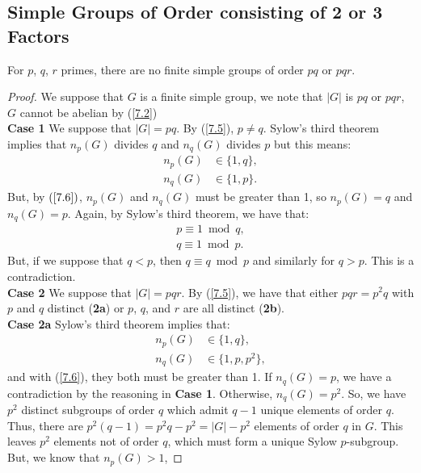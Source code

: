 \subsection{Simple Groups of Order consisting of 2 or 3 Factors} \label{7.8}

For $p$, $q$, $r$ primes, there are no finite simple groups
of order $pq$ or $pqr$.

\begin{proof}
    We suppose that $G$ is a finite simple group, we note that
    $|G|$ is $pq$ or $pqr$, $G$ cannot be abelian by (\ref{7.2})
    \\[\baselineskip]
    \textbf{Case 1} We suppose that $|G| = pq$. By (\ref{7.5}),
    $p \neq q$. Sylow's third theorem implies that $n_p(G)$ 
    divides $q$ and $n_q(G)$ divides $p$ but this means: \begin{align*}
        n_p(G) &\in \{1, q\}, \\
        n_q(G) &\in \{1, p\}.
    \end{align*} But, by $(\ref{7.6})$, $n_p(G)$ and $n_q(G)$ must
    be greater than 1, so $n_p(G) = q$ and $n_q(G) = p$.
    Again, by Sylow's third theorem, we have that: \begin{align*}
        p \equiv 1 \bmod q, \\ 
        q \equiv 1 \bmod p.
    \end{align*} But, if we suppose that $q < p$, then $q \equiv q
    \bmod p$ and similarly for $q > p$. This is a contradiction.
    \\[\baselineskip]
    \textbf{Case 2} We suppose that $|G| = pqr$. By (\ref{7.5}),
    we have that either $pqr = p^2q$ with $p$ and $q$ distinct 
    (\textbf{2a})
    or $p$, $q$, and $r$ are all distinct (\textbf{2b}).
    \\[\baselineskip]
    \textbf{Case 2a} Sylow's third theorem implies that: \begin{align*}
        n_p(G) &\in \{1, q\}, \\
        n_q(G) &\in \{1, p, p^2\},
    \end{align*} and with (\ref{7.6}), they both must be greater than
    1. If $n_q(G) = p$, we have a contradiction by the reasoning
    in \textbf{Case 1}. Otherwise, $n_q(G) = p^2$. So, we have 
    $p^2$ distinct subgroups of order $q$ which admit $q - 1$
    unique elements of order $q$. Thus, there are 
    $p^2(q - 1) = p^2q - p^2 = |G| - p^2$ elements of order $q$ in $G$.
    This leaves $p^2$ elements not of order $q$, which must form
    a unique Sylow $p$-subgroup. But, we know that $n_p(G) > 1$,

\end{proof}
